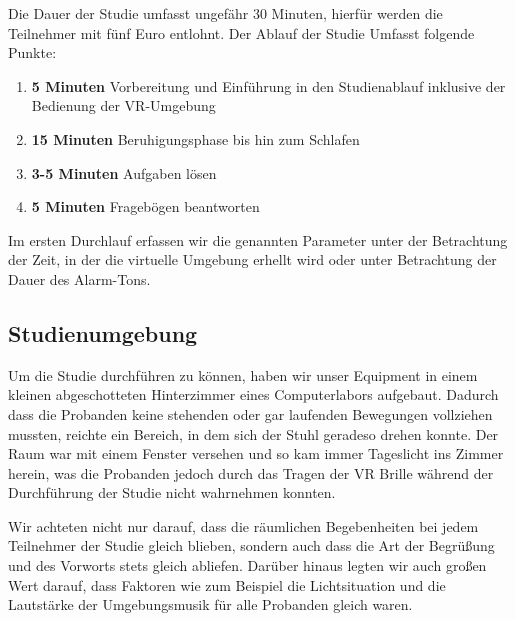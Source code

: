 Die Dauer der Studie umfasst ungefähr 30 Minuten, hierfür werden die Teilnehmer mit fünf Euro entlohnt. Der Ablauf der Studie Umfasst folgende Punkte:

\begin{enumerate}
	\item \textbf{5 Minuten} Vorbereitung und Einführung in den Studienablauf inklusive der Bedienung der VR-Umgebung
	\item \textbf{15 Minuten} Beruhigungsphase bis hin zum Schlafen
	\item \textbf{3-5 Minuten} Aufgaben lösen
	\item \textbf{5 Minuten} Fragebögen beantworten
\end{enumerate}

Im ersten Durchlauf erfassen wir die genannten Parameter unter der Betrachtung der Zeit, in der die virtuelle Umgebung erhellt wird oder unter Betrachtung der Dauer des Alarm-Tons.

\subsection{Studienumgebung}

Um die Studie durchführen zu können, haben wir unser Equipment in einem kleinen abgeschotteten Hinterzimmer eines Computerlabors aufgebaut. Dadurch dass die Probanden keine stehenden oder gar laufenden Bewegungen vollziehen mussten, reichte ein Bereich, in dem sich der Stuhl geradeso drehen konnte. Der Raum war mit einem Fenster versehen und so kam immer Tageslicht ins Zimmer herein, was die Probanden jedoch durch das Tragen der VR Brille während der Durchführung der Studie nicht wahrnehmen konnten. 

Wir achteten nicht nur darauf, dass die räumlichen Begebenheiten bei jedem Teilnehmer der Studie gleich blieben, sondern auch dass die Art der Begrüßung und des Vorworts stets gleich abliefen. 
Darüber hinaus legten wir auch großen Wert darauf, dass Faktoren wie zum Beispiel die Lichtsituation und die Lautstärke der Umgebungsmusik für alle Probanden gleich waren.
